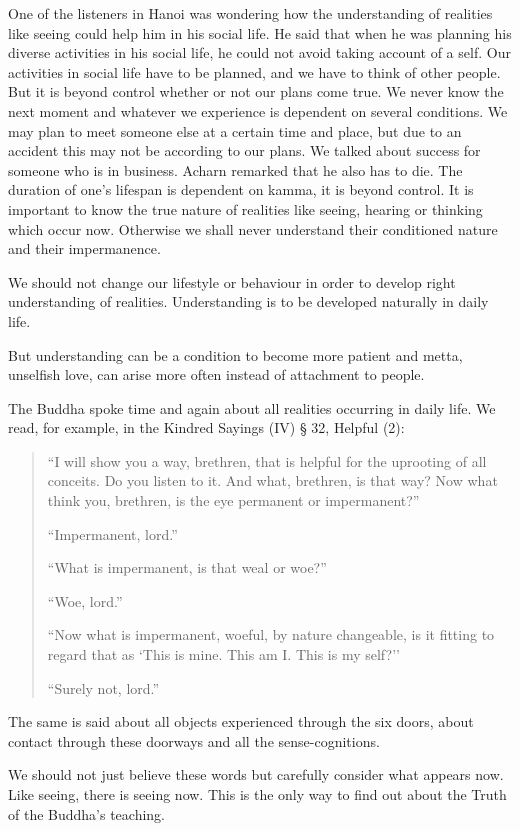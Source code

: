 One of the listeners in Hanoi was wondering how the understanding of realities 
like seeing could help him in his social life. He said that when he was planning 
his diverse activities in his social life, he could not avoid taking account of a 
self. Our activities in social life have to be planned, and we have to think of other people. But it is beyond control whether or not our plans come true. We never know the next moment and whatever we experience is dependent on several 
conditions. We may plan to meet someone else at a certain time and place, but 
due to an accident this may not be according to our plans. We talked about success for someone who is in business. Acharn remarked that he also has to die. 
The duration of one's lifespan is dependent on kamma, it is beyond control. It is 
important to know the true nature of realities like seeing, hearing or thinking 
which occur now. Otherwise we shall never understand their conditioned nature 
and their impermanence. 

We should not change our lifestyle or behaviour in order to develop right understanding of realities. Understanding is to be developed naturally in daily life.

But understanding can be a condition to become more patient and metta, unselfish love, can arise more often instead of attachment to people. 

The Buddha spoke time and again about all realities occurring in daily life. We 
read, for example, in the Kindred Sayings (IV) § 32, Helpful (2): 

\begin{quote}
``I will show you a way, brethren, that is helpful for the uprooting of all conceits. Do you listen to it. And what, brethren, is that 
way? Now what think you, brethren, is the eye permanent or impermanent?''

``Impermanent, lord.''

``What is impermanent, is that weal or woe?''

``Woe, lord.'' 

``Now what is impermanent, woeful, by nature changeable, is it 
fitting to regard that as `This is mine. This am I. This is my 
self?''

``Surely not, lord.'' 
\end{quote}

The same is said about all objects experienced through the six doors, about contact through these doorways and all the sense-cognitions. 

We should not just believe these words but carefully consider what appears 
now. Like seeing, there is seeing now. This is the only way to find out about the 
Truth of the Buddha's teaching. 


